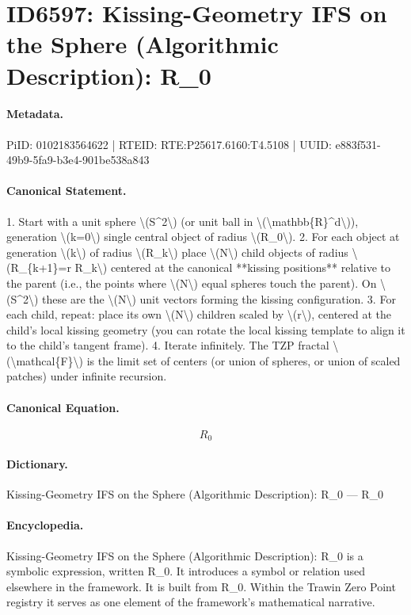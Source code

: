 \section*{ID6597: Kissing-Geometry IFS on the Sphere (Algorithmic Description): R\_0}
\paragraph{Metadata.}
PiID: 0102183564622 | RTEID: RTE:P25617.6160:T4.5108 | UUID: e883f531-49b9-5fa9-b3e4-901be538a843

\paragraph{Canonical Statement.}
1. Start with a unit sphere \textbackslash{}(S\textasciicircum{}2\textbackslash{}) (or unit ball in \textbackslash{}(\textbackslash{}mathbb\{R\}\textasciicircum{}d\textbackslash{})), generation \textbackslash{}(k=0\textbackslash{}) single central object of radius \textbackslash{}(R\_0\textbackslash{}). 2. For each object at generation \textbackslash{}(k\textbackslash{}) of radius \textbackslash{}(R\_k\textbackslash{}) place \textbackslash{}(N\textbackslash{}) child objects of radius \textbackslash{}(R\_\{k+1\}=r R\_k\textbackslash{}) centered at the canonical **kissing positions** relative to the parent (i.e., the points where \textbackslash{}(N\textbackslash{}) equal spheres touch the parent). On \textbackslash{}(S\textasciicircum{}2\textbackslash{}) these are the \textbackslash{}(N\textbackslash{}) unit vectors forming the kissing configuration. 3. For each child, repeat: place its own \textbackslash{}(N\textbackslash{}) children scaled by \textbackslash{}(r\textbackslash{}), centered at the child’s local kissing geometry (you can rotate the local kissing template to align it to the child’s tangent frame). 4. Iterate infinitely. The TZP fractal \textbackslash{}(\textbackslash{}mathcal\{F\}\textbackslash{}) is the limit set of centers (or union of spheres, or union of scaled patches) under infinite recursion.

\paragraph{Canonical Equation.}
\[
R_0
\]

\paragraph{Dictionary.}
Kissing-Geometry IFS on the Sphere (Algorithmic Description): R\_0 — R\_0

\paragraph{Encyclopedia.}
Kissing-Geometry IFS on the Sphere (Algorithmic Description): R\_0 is a symbolic expression, written R\_0. It introduces a symbol or relation used elsewhere in the framework. It is built from R\_0. Within the Trawin Zero Point registry it serves as one element of the framework's mathematical narrative.

